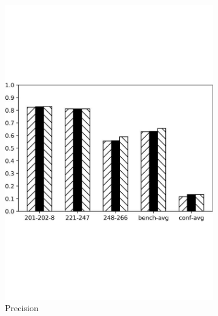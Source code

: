 \documentclass[twoside]{article}
\begin{document}
\begin{figure}[htb!]
\begin{subfigure}{0.3\textwidth}
\includegraphics[width=\textwidth]{data_figs/MulRegress_OLA_P.pdf}
\caption{Precision}
\label{fig:MultiRegress_OLA_P}
\end{subfigure}
\begin{subfigure}{0.3\textwidth}
	\centering

\end{subfigure}
\end{figure}
\end{document}
